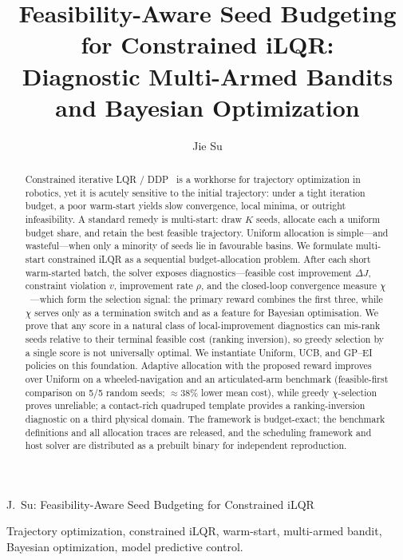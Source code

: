 \documentclass[lettersize,journal]{IEEEtran}
\begin{document}
\title{Feasibility-Aware Seed Budgeting for Constrained iLQR:\\
Diagnostic Multi-Armed Bandits and Bayesian Optimization}
\author{Jie Su}
%
{J.~Su: Feasibility-Aware Seed Budgeting for Constrained iLQR}
\maketitle

\begin{abstract}
Constrained iterative LQR / DDP~\cite{tassa2012,howell2019,mastalli2020} is a workhorse for trajectory optimization in robotics, yet it is acutely sensitive to the initial trajectory: under a tight iteration budget, a poor warm-start yields slow convergence, local minima, or outright infeasibility. A standard remedy is multi-start: draw $K$ seeds, allocate each a uniform budget share, and retain the best feasible trajectory. Uniform allocation is simple---and wasteful---when only a minority of seeds lie in favourable basins. We formulate multi-start constrained iLQR as a sequential budget-allocation problem. After each short warm-started batch, the solver exposes diagnostics---feasible cost improvement $\Delta J$, constraint violation $v$, improvement rate $\rho$, and the closed-loop convergence measure $\chi$~\cite{zhu2024}---which form the selection signal: the primary reward combines the first three, while $\chi$ serves only as a termination switch and as a feature for Bayesian optimisation. We prove that any score in a natural class of local-improvement diagnostics can mis-rank seeds relative to their terminal feasible cost (ranking inversion), so greedy selection by a single score is not universally optimal. We instantiate Uniform, UCB, and GP--EI policies on this foundation. Adaptive allocation with the proposed reward improves over Uniform on a wheeled-navigation and an articulated-arm benchmark (feasible-first comparison on 5/5 random seeds; $\approx$38\% lower mean cost), while greedy $\chi$-selection proves unreliable; a contact-rich quadruped template provides a ranking-inversion diagnostic on a third physical domain. The framework is budget-exact; the benchmark definitions and all
allocation traces are released, and the scheduling framework and host
solver are distributed as a prebuilt binary for independent reproduction.
\end{abstract}

\begin{IEEEkeywords}
Trajectory optimization, constrained iLQR, warm-start, multi-armed bandit, Bayesian optimization, model predictive control.
\end{IEEEkeywords}
\end{document}
